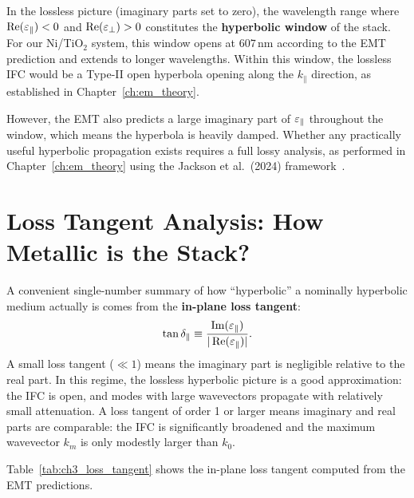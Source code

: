 In the lossless picture (imaginary parts set to zero), the wavelength range
where $\operatorname{Re}(\varepsilon_{\parallel}) < 0$ and $\operatorname{Re}(\varepsilon_{\perp}) > 0$ constitutes the \textbf{hyperbolic
window} of the stack. For our Ni/TiO$_2$ system, this window opens at $607$\,nm
according to the EMT prediction and extends to longer wavelengths. Within this
window, the lossless IFC would be a Type-II open hyperbola opening along the
$k_\parallel$ direction, as established in Chapter~\ref{ch:em_theory}.

However, the EMT also predicts a large imaginary part of $\varepsilon_{\parallel}$ throughout
the window, which means the hyperbola is heavily damped. Whether any
practically useful hyperbolic propagation exists requires a full lossy
analysis, as performed in Chapter~\ref{ch:em_theory} using the Jackson et al.\
(2024) framework~\cite{jackson2024}.

\section{Loss Tangent Analysis: How Metallic is the Stack?}

A convenient single-number summary of how ``hyperbolic'' a nominally hyperbolic
medium actually is comes from the \textbf{in-plane loss tangent}:
\begin{equation}
  \tan\delta_\parallel \equiv \frac{\operatorname{Im}(\varepsilon_{\parallel})}{|\operatorname{Re}(\varepsilon_{\parallel})|}.
  \label{eq:ch3_loss_tangent}
\end{equation}
A small loss tangent ($\ll 1$) means the imaginary part is negligible relative
to the real part. In this regime, the lossless hyperbolic picture is a good
approximation: the IFC is open, and modes with large wavevectors propagate with
relatively small attenuation. A loss tangent of order 1 or larger means
imaginary and real parts are comparable: the IFC is significantly broadened and
the maximum wavevector $k_m$ is only modestly larger than $k_0$.

Table~\ref{tab:ch3_loss_tangent} shows the in-plane loss tangent computed from
the EMT predictions.

